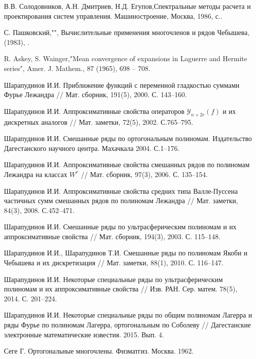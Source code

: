 \begin{thebibliography}{20}
В.В. Солодовников, А.Н. Дмитриев, Н.Д. Егупов,Спектральные методы расчета и проектирования систем управления. Машиностроение, Москва, 1986,  с..

С. Пашковский,"", Вычислительные применения многочленов и рядов Чебышева,  (1983), .

R. Askey, S. Wainger,"Mean convergence of expansions in Laguerre and Hermite series", Amer. J. Mathem., 87 (1965), 698 -- 708.

{Шарапудинов И.И.} Приближение функций с переменной гладкостью суммами Фурье Лежандра // Мат. сборник,
191(5), 2000. С. 143--160.


{Шарапудинов И.И.} Аппроксимативные свойства операторов $\mathcal{ Y}_{n+2r}(f)$ и их дискретных аналогов // Мат. заметки, 72(5), 2002. С.765--795.


{Шарапудинов И.И.} Смешанные ряды по ортогональным полиномам. Издательство Дагестанского научного центра.
Махачкала 2004. С.1--176.


{Шарапудинов И.И.}
Аппроксимативные свойства смешанных рядов по полиномам Лежандра на классах $W^r$ //
Мат. сборник, 97(3), 2006. С. 135--154.


{Шарапудинов И.И.}
Аппроксимативные свойства средних типа Валле-Пуссена частичных сумм смешанных рядов по полиномам Лежандра // Мат. заметки, 84(3), 2008. С.452--471.


{Шарапудинов И.И.}
Смешанные ряды по ультрасферическим полиномам и их аппроксимативные свойства
// Мат. сборник, 194(3), 2003. С. 115--148.


{Шарапудинов И.И., Шарапудинов Т.И.}
Смешанные ряды по полиномам Якоби и Чебышева и их дискретизация
// Мат. заметки, 88(1), 2010. С. 116--147.


{Шарапудинов И.И.}
Некоторые специальные ряды по ультрасферическим полиномам и их аппроксимативные свойства
// Изв. РАН. Сер. матем. 78(5), 2014. С. 201--224.


{Шарапудинов И.И.}
Некоторые специальные ряды по общим полиномам Лагерра и ряды Фурье по полиномам Лагерра, ортогональным по Соболеву
// Дагестанские электронные математические известия. 2015. Вып. 4.


{Сеге Г.} Ортогональные многочлены. Физматгиз. Москва. 1962.



\end{thebibliography}
